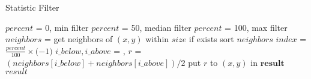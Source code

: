 \documentclass{article}
\begin{document}
  \begin{algorithm}
    \caption{Statistic Filter}
    \label{Statistic}
    \begin{algorithmic}[1]
    \LineComment $percent$ = 0, min filter
    \LineComment $percent$ = 50, median filter
    \LineComment $percent$ = 100, max filter
    \State $neighbors$ = get neighbors of $(x,y)$ within $size$ if exists
    \State sort $neighbors$
    \State $index$ = $\frac{percent}{100}\times($$-1)$
    \State $i\_below, i\_above$ = , 
    \State $r$ = $(neighbors[i\_below] + neighbors[i\_above]) / 2$
    \State put $r$ to $(x,y)$ in $\mathbf{result}$
    \EndFor
    \State \Return $result$
    \EndFunction
    \end{algorithmic}
  \end{algorithm}
\end{document}
